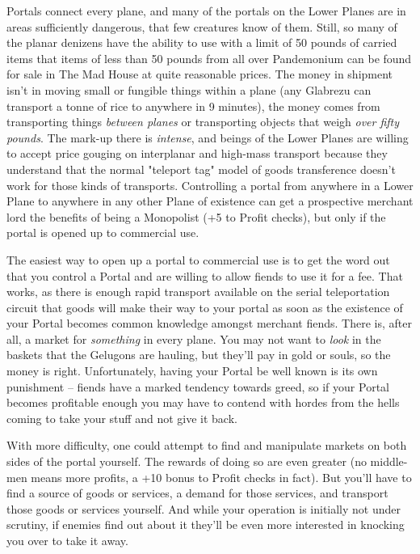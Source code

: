 Portals connect every plane, and many of the portals on the Lower Planes are in areas sufficiently dangerous, that few creatures know of them. Still, so many of the planar denizens have the ability to use  with a limit of 50 pounds of carried items that items of less than 50 pounds from all over Pandemonium can be found for sale in The Mad House at quite reasonable prices. The money in shipment isn't in moving small or fungible things within a plane (any Glabrezu can transport a tonne of rice to anywhere in 9 minutes), the money comes from transporting things \textit{between planes} or transporting objects that weigh \textit{over fifty pounds}. The mark-up there is \textit{intense}, and beings of the Lower Planes are willing to accept price gouging on interplanar and high-mass transport because they understand that the normal "teleport tag" model of goods transference doesn't work for those kinds of transports. Controlling a portal from anywhere in a Lower Plane to anywhere in any other Plane of existence can get a prospective merchant lord the benefits of being a Monopolist (+5 to Profit checks), but only if the portal is opened up to commercial use.

The easiest way to open up a portal to commercial use is to get the word out that you control a Portal and are willing to allow fiends to use it for a fee. That works, as there is enough rapid transport available on the serial teleportation circuit that goods will make their way to your portal as soon as the existence of your Portal becomes common knowledge amongst merchant fiends. There is, after all, a market for \textit{something} in every plane. You may not want to \textit{look} in the baskets that the Gelugons are hauling, but they'll pay in gold or souls, so the money is right. Unfortunately, having your Portal be well known is its own punishment -- fiends have a marked tendency towards greed, so if your Portal becomes profitable enough you may have to contend with hordes from the hells coming to take your stuff and not give it back.

With more difficulty, one could attempt to find and manipulate markets on both sides of the portal yourself. The rewards of doing so are even greater (no middle-men means more profits, a +10 bonus to Profit checks in fact). But you'll have to find a source of goods or services, a demand for those services, and transport those goods or services yourself. And while your operation is initially not under scrutiny, if enemies find out about it they'll be even more interested in knocking you over to take it away.

